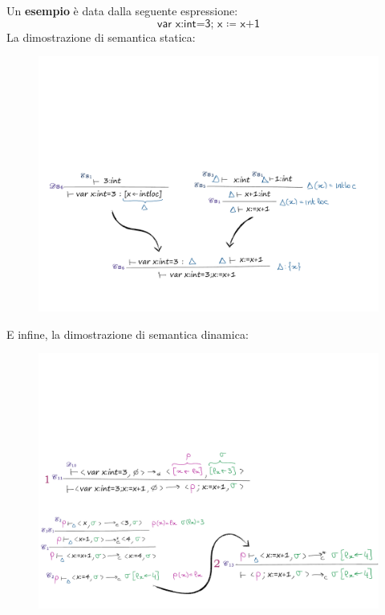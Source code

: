\documentclass[a4paper]{article}
\begin{document}
 	Un \textcolor{Green4}{\textbf{esempio}} è data dalla seguente espressione:
 	\begin{equation*}
 		\textsf{var x:int=3; x $\coloneq$ x+1}
 	\end{equation*}
 	La dimostrazione di semantica statica:
 	\begin{figure}[!htp]
 		\centering
 		\includegraphics[width=\textwidth]{img/imp_esempio-blocchi-1.pdf}
 	\end{figure}\newpage

 	\noindent
 	E infine, la dimostrazione di semantica dinamica:
 	\begin{figure}[!htp]
 		\centering
 		\includegraphics[width=\textwidth]{img/imp_esempio-blocchi-2.pdf}
 	\end{figure}
 	
\end{document}
